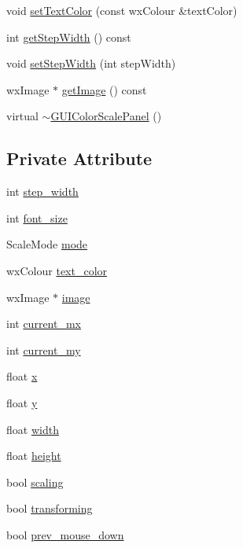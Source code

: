 \begin{DoxyCompactItemize}
\item 
void \hyperlink{classGUIColorScalePanel_ad9056636be2c0707127225484f0d0392}{set\-Text\-Color} (const wx\-Colour \&text\-Color)
\item 
int \hyperlink{classGUIColorScalePanel_a5b69bf4853de97fa2445721165cab206}{get\-Step\-Width} () const 
\item 
void \hyperlink{classGUIColorScalePanel_aba534a319236878bc3504050d8227fe4}{set\-Step\-Width} (int step\-Width)
\item 
wx\-Image $\ast$ \hyperlink{classGUIColorScalePanel_ac793a56373a8f7f5cb8d3e413c26e8e7}{get\-Image} () const 
\item 
virtual \hyperlink{classGUIColorScalePanel_a7e6f0e0703269ce666989af49fef3369}{$\sim$\-G\-U\-I\-Color\-Scale\-Panel} ()
\end{DoxyCompactItemize}
\subsection*{Private Attribute}
\begin{DoxyCompactItemize}
\item 
int \hyperlink{classGUIColorScalePanel_a5f9789cc727854594c7d29c392578427}{step\-\_\-width}
\item 
int \hyperlink{classGUIColorScalePanel_acd79c1dedc939040b03f54f21e78d72f}{font\-\_\-size}
\item 
Scale\-Mode \hyperlink{classGUIColorScalePanel_ad2f795e0d3a1c8e731da16d3320dbd34}{mode}
\item 
wx\-Colour \hyperlink{classGUIColorScalePanel_a48e282e7a3bfff30894e9e6edfd120dc}{text\-\_\-color}
\item 
wx\-Image $\ast$ \hyperlink{classGUIColorScalePanel_ac398e4b12cea263a89db6dd236ec1e87}{image}
\item 
int \hyperlink{classGUIColorScalePanel_ab3da81e6c3cfb9122c0291584276a54d}{current\-\_\-mx}
\item 
int \hyperlink{classGUIColorScalePanel_abb73679c805d8bcdd1ca0cb602887f84}{current\-\_\-my}
\item 
float \hyperlink{classGUIColorScalePanel_a41599e2046e6766d5276c95d4aa54ad3}{x}
\item 
float \hyperlink{classGUIColorScalePanel_a5a33f7666c1c49ca8cfe2e4de3dd06e0}{y}
\item 
float \hyperlink{classGUIColorScalePanel_a1bc7bdf89d2447cddd08f5ae5f6638fa}{width}
\item 
float \hyperlink{classGUIColorScalePanel_a5bbc9ff741f566a75f757e54324dac5a}{height}
\item 
bool \hyperlink{classGUIColorScalePanel_aec005c07c64a17ffe6d362f4de0a04b1}{scaling}
\item 
bool \hyperlink{classGUIColorScalePanel_a3330450ed906fb99f56ed825d53f69e1}{transforming}
\item 
bool \hyperlink{classGUIColorScalePanel_ac7050aa7729236561154b0b9be894ed6}{prev\-\_\-mouse\-\_\-down}
\end{DoxyCompactItemize}


